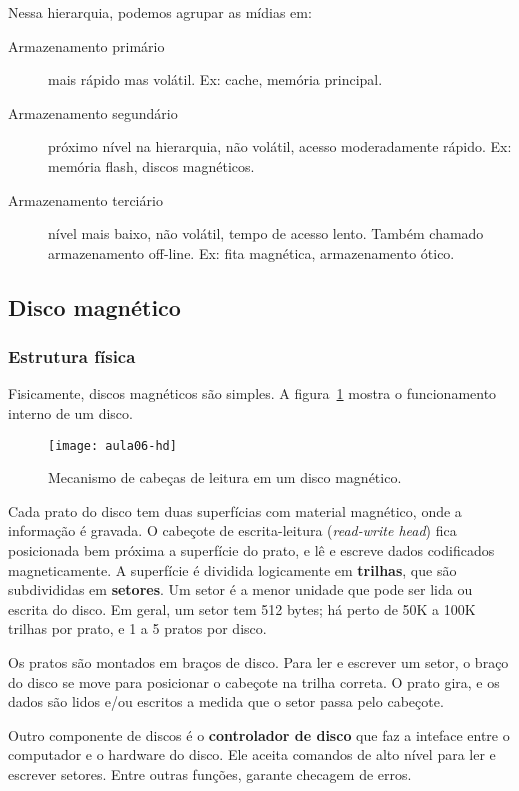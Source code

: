 Nessa hierarquia, podemos agrupar as mídias em:
\begin{description}
\item[Armazenamento primário] mais rápido mas volátil. Ex: cache, memória principal.

\item[Armazenamento segundário] próximo nível na hierarquia, não volátil,
acesso moderadamente rápido. Ex: memória flash, discos magnéticos.

\item[Armazenamento terciário] nível mais baixo, não volátil, tempo de acesso
lento. Também chamado armazenamento off-line. Ex: fita magnética, armazenamento ótico.
\end{description}

\subsection{Disco magnético}

\subsubsection{Estrutura física}

Fisicamente, discos magnéticos são simples.
A figura~\ref{aula06:fig:hd} mostra o funcionamento interno de um disco.
%
\begin{figure}[!htb]
\centering
\texttt{[image: aula06-hd]}
\caption{Mecanismo de cabeças de leitura em um disco magnético.}
\label{aula06:fig:hd}
\end{figure}

Cada prato do disco tem duas superfícias com material magnético, onde a informação
é gravada.
O cabeçote de escrita-leitura (\emph{read-write head}) fica posicionada bem 
próxima a superfície do prato, e lê e escreve dados codificados magneticamente.
A superfície é dividida logicamente em {\bf trilhas}, que são subdivididas em 
\textbf{setores}. 
Um setor é a menor unidade que pode ser lida ou escrita do disco.
Em geral, um setor tem 512 bytes; há perto de 50K a 100K trilhas por prato, e 1
a 5 pratos por disco.

Os pratos são montados em braços de disco.
Para ler e escrever um setor, o braço do disco se move para posicionar o cabeçote
na trilha correta.
O prato gira, e os dados são lidos e/ou escritos a medida que o setor
passa pelo cabeçote.

Outro componente de discos é o {\bf controlador de disco} que faz a inteface 
entre o computador e o hardware do disco.
Ele aceita comandos de alto nível para ler e escrever setores.
Entre outras funções, garante checagem de erros.

